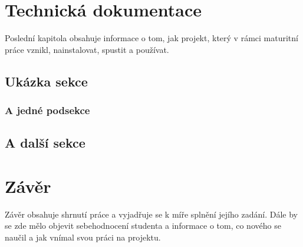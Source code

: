 \documentclass[11pt,a4paper,twoside,openright]{report}
\let\openright=\cleardoublepage
\begin{document}
\chapter{Technická dokumentace}

Poslední kapitola obsahuje informace o tom, jak projekt, který v rámci maturitní práce vznikl, nainstalovat, spustit a používat.

\section{Ukázka sekce}

\lipsum[5]

\subsection{A jedné podsekce}

\lipsum

\section{A další sekce}

\lipsum

\chapter*{Závěr}
\pagestyle{empty}

Závěr obsahuje shrnutí práce a vyjadřuje se k míře splnění jejího zadání. Dále by se zde mělo objevit sebehodnocení studenta a informace o tom, co nového se naučil a jak vnímal svou práci na projektu.

\nocite{einstein}\nocite{latexcompanion}\nocite{knuthwebsite}
\printbibliography[title={Seznam použité literatury},heading={bibintoc}]

\openright
\listoffigures
{}

\clearpage
\listoftables
{}


\end{document}

